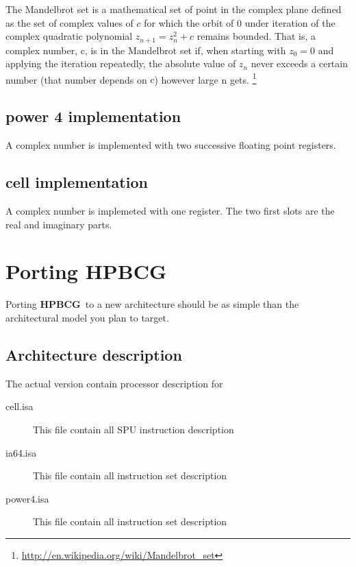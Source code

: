 \documentclass{article}
\newcommand{\hpbcg}{\textbf{HPBCG}\ }
\begin{document}
The Mandelbrot set is a mathematical set of point in the complex plane
defined as the set of complex values of $c$ for which the orbit of 0
under iteration of the complex quadratic polynomial $z_{n+1} = z_n^2 + c$
remains bounded. That is, a complex number, c, is in the Mandelbrot
set if, when starting with $z_0=0$ and applying the iteration repeatedly,
the absolute value of $z_n$ never exceeds a certain number (that number
depends on $c$) however large n
gets. \footnote{\url{http://en.wikipedia.org/wiki/Mandelbrot_set}}

\subsection{power 4 implementation}

A complex number is implemented with two successive floating point registers.

\subsection{cell implementation}

A complex number is implemeted with one register. The two first slots
are the real and imaginary parts.

\section{Porting \hpbcg}

Porting \hpbcg to a new architecture should be as simple than the
architectural model you plan to target.

\subsection{Architecture description}

The actual version contain processor description for 
\begin{description}
\item[cell.isa] This file contain all SPU instruction description
\item[ia64.isa] This file contain all instruction set description
\item[power4.isa] This file contain all instruction set description
\end{description}
\end{document}
